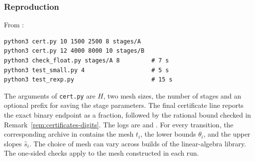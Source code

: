 \subsubsection*{Reproduction}
From :
{\footnotesize
\begin{verbatim}
python3 cert.py 10 1500 2500 8 stages/A
python3 cert.py 12 4000 8000 10 stages/B
python3 check_float.py stages/A 8         # 7 s
python3 test_small.py 4                   # 5 s
python3 test_rexp.py                      # 15 s
\end{verbatim}}
The arguments of \texttt{cert.py} are $H$, two mesh sizes, the number of stages and an
optional prefix for saving the stage parameters. The final certificate line reports the
exact binary endpoint as a fraction, followed by the rational bound checked in
Remark~\ref{rem:certificates-digits}. The logs are  and
. For every transition, the corresponding archive in 
contains the mesh $t_i$, the lower bounds $\theta_i$, and the upper slopes $\hat s_i$.
The choice of mesh can vary across builds of the linear-algebra library. The one-sided
checks apply to the mesh constructed in each run.

